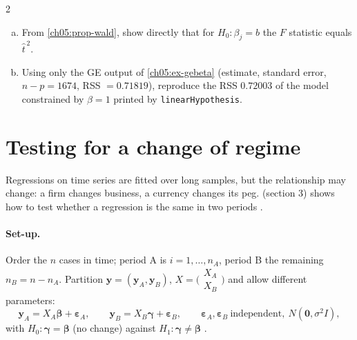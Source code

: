 \begin{paracol}{2}
\begin{exercise}[not from the course: $t^2=F$ on real numbers]
\leavevmode
\begin{enumerate}[(a)]
  \item From \cref{ch05:prop-wald}, show directly that for $H_0:\beta_j=b$ the $F$ statistic equals $\hat t^{\,2}$.
  \item Using only the
      GE output of \cref{ch05:ex-gebeta} (estimate, standard error, $n-p=1674$, RSS $=0.71819$), reproduce the RSS $0.72003$ of the
      model constrained by $\beta=1$ printed by \texttt{linearHypothesis}.
\end{enumerate}
\end{exercise}

\section{Testing for a change of regime}\label{ch05:sec-chow}
Regressions on time series are fitted over long samples, but the relationship may change: a firm changes business,
a currency changes its peg.  (section 3) shows how to test whether a regression is the same in two
periods .

\paragraph{Set-up.} Order the $n$ cases in time; period A is $i=1,\dots,n_A$, period B the remaining
$n_B=n-n_A$. Partition $\bm y=(\bm y_A,\bm y_B)$, $X=\bigl(\begin{smallmatrix}X_A\\X_B\end{smallmatrix}\bigr)$ and allow different parameters:
\[
  \bm y_A=X_A\bm\beta+\bm\varepsilon_A,\qquad \bm y_B=X_B\bm\gamma+\bm\varepsilon_B,\qquad \bm\varepsilon_A,\bm\varepsilon_B\ \text{independent},\ N(\bm 0,\sigma^2I),
\]
with $H_0:\bm\gamma=\bm\beta$ (no change) against $H_1:\bm\gamma\neq\bm\beta$ .


\end{paracol}
